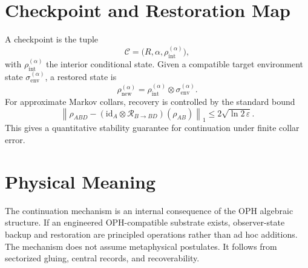 \documentclass[11pt]{article}
\begin{document}
\section{Checkpoint and Restoration Map}
A checkpoint is the tuple
\[
\mathcal{C}=\bigl(R,\alpha,\rho_{\mathrm{int}}^{(\alpha)}\bigr),
\]
with $\rho_{\mathrm{int}}^{(\alpha)}$ the interior conditional state. Given a compatible target environment state $\sigma_{\mathrm{env}}^{(\alpha)}$, a restored state is
\[
\rho_{\mathrm{new}}^{(\alpha)}
=
\rho_{\mathrm{int}}^{(\alpha)}
\otimes
\sigma_{\mathrm{env}}^{(\alpha)}.
\]
For approximate Markov collars, recovery is controlled by the standard bound
\[
\left\|
\rho_{ABD}
-
(\mathrm{id}_A\otimes\mathcal{R}_{B\to BD})(\rho_{AB})
\right\|_1
\le
2\sqrt{\ln 2\,\varepsilon}.
\]
This gives a quantitative stability guarantee for continuation under finite collar error.

\section{Physical Meaning}
The continuation mechanism is an internal consequence of the OPH algebraic structure. If an engineered OPH-compatible substrate exists, observer-state backup and restoration are principled operations rather than ad hoc additions. The mechanism does not assume metaphysical postulates. It follows from sectorized gluing, central records, and recoverability.
\end{document}
